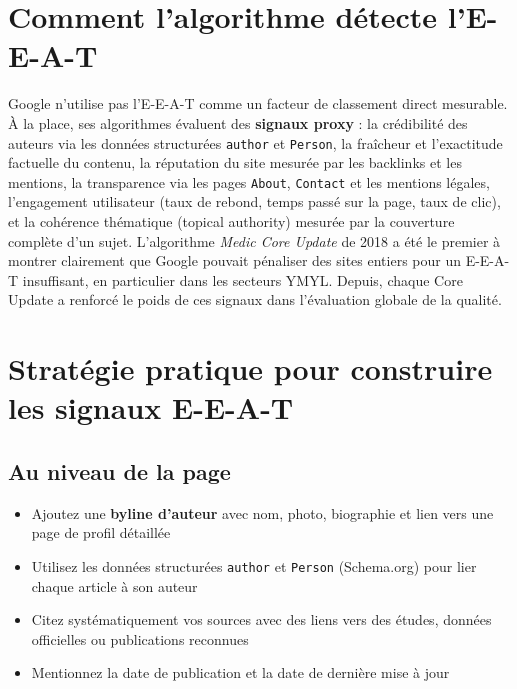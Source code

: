 \documentclass[12pt,a4paper,twoside]{report}
\newcommand{\keyword}[1]{\textbf{\textcolor{googleblue}{#1}}}
\begin{document}
\section{Comment l'algorithme détecte l'E-E-A-T}

Google n'utilise pas l'E-E-A-T comme un facteur de classement direct mesurable. À la place, ses algorithmes évaluent des \keyword{signaux proxy} : la crédibilité des auteurs via les données structurées \texttt{author} et \texttt{Person}, la fraîcheur et l'exactitude factuelle du contenu, la réputation du site mesurée par les backlinks et les mentions, la transparence via les pages \texttt{About}, \texttt{Contact} et les mentions légales, l'engagement utilisateur (taux de rebond, temps passé sur la page, taux de clic), et la cohérence thématique (topical authority) mesurée par la couverture complète d'un sujet. L'algorithme \textit{Medic Core Update} de 2018 a été le premier à montrer clairement que Google pouvait pénaliser des sites entiers pour un E-E-A-T insuffisant, en particulier dans les secteurs YMYL. Depuis, chaque Core Update a renforcé le poids de ces signaux dans l'évaluation globale de la qualité.

\section{Stratégie pratique pour construire les signaux E-E-A-T}

\subsection{Au niveau de la page}
\begin{itemize}
    \item Ajoutez une \keyword{byline d'auteur} avec nom, photo, biographie et lien vers une page de profil détaillée
    \item Utilisez les données structurées \texttt{author} et \texttt{Person} (Schema.org) pour lier chaque article à son auteur
    \item Citez systématiquement vos sources avec des liens vers des études, données officielles ou publications reconnues
    \item Mentionnez la date de publication et la date de dernière mise à jour
\end{itemize}
\end{document}
